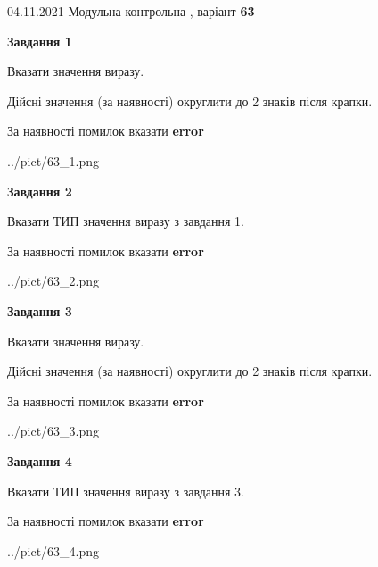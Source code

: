 \documentclass[11pt, ukrainian]{article}
\begin{document}
{04.11.2021 Модульна контрольна , варіант  \No \textbf { 63 }\par}
{
\begin {large}
{\begin {center}\textbf{Завдання 1}\end {center}}\par
Вказати значення виразу. \par
Дійсні значення (за наявності) округлити до 2 знаків після крапки. \par
За наявності помилок вказати \textbf{error}

\begin{center}
	{../pict/63_1.png}
\end{center}
\newpage

{\begin {center}\textbf{Завдання 2}\end {center}}\par
Вказати ТИП значення виразу з завдання 1. \par
За наявності помилок вказати \textbf{error}

\begin{center}
	{../pict/63_2.png}
\end{center}
\newpage

{\begin {center}\textbf{Завдання 3}\end {center}}\par
Вказати значення виразу. \par
Дійсні значення (за наявності) округлити до 2 знаків після крапки. \par
За наявності помилок вказати \textbf{error}

\begin{center}
	{../pict/63_3.png}
\end{center}
\newpage

{\begin {center}\textbf{Завдання 4}\end {center}}\par
Вказати ТИП значення виразу з завдання 3. \par
За наявності помилок вказати \textbf{error}

\begin{center}
	{../pict/63_4.png}
\end{center}
\newpage


\end{large}}
\end{document}
